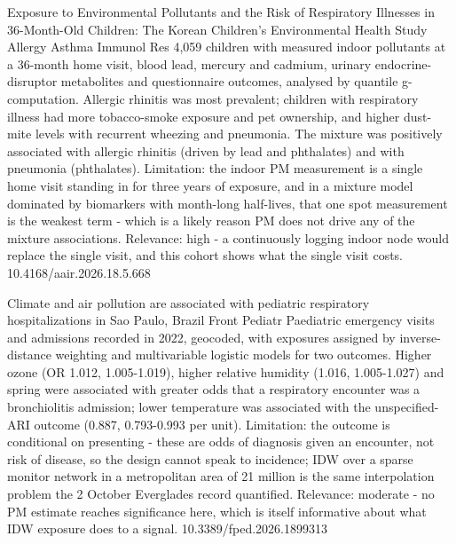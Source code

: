 \documentclass[10pt]{article}
\begin{document}

{Exposure to Environmental Pollutants and the Risk of Respiratory Illnesses in 36-Month-Old Children: The Korean Children's Environmental Health Study}
{Allergy Asthma Immunol Res}
{4,059 children with measured indoor pollutants at a 36-month home visit, blood lead, mercury and cadmium, urinary endocrine-disruptor metabolites and questionnaire outcomes, analysed by quantile g-computation. Allergic rhinitis was most prevalent; children with respiratory illness had more tobacco-smoke exposure and pet ownership, and higher dust-mite levels with recurrent wheezing and pneumonia. The mixture was positively associated with allergic rhinitis (driven by lead and phthalates) and with pneumonia (phthalates). Limitation: the indoor PM measurement is a single home visit standing in for three years of exposure, and in a mixture model dominated by biomarkers with month-long half-lives, that one spot measurement is the weakest term - which is a likely reason PM does not drive any of the mixture associations. Relevance: high - a continuously logging indoor node would replace the single visit, and this cohort shows what the single visit costs.}
{10.4168/aair.2026.18.5.668}

{Climate and air pollution are associated with pediatric respiratory hospitalizations in Sao Paulo, Brazil}
{Front Pediatr}
{Paediatric emergency visits and admissions recorded in 2022, geocoded, with exposures assigned by inverse-distance weighting and multivariable logistic models for two outcomes. Higher ozone (OR 1.012, 1.005-1.019), higher relative humidity (1.016, 1.005-1.027) and spring were associated with greater odds that a respiratory encounter was a bronchiolitis admission; lower temperature was associated with the unspecified-ARI outcome (0.887, 0.793-0.993 per unit). Limitation: the outcome is conditional on presenting - these are odds of diagnosis given an encounter, not risk of disease, so the design cannot speak to incidence; IDW over a sparse monitor network in a metropolitan area of 21 million is the same interpolation problem the 2 October Everglades record quantified. Relevance: moderate - no PM estimate reaches significance here, which is itself informative about what IDW exposure does to a signal.}
{10.3389/fped.2026.1899313}

\par{}\baselineskip{}\baselineskip
{}
\end{document}

